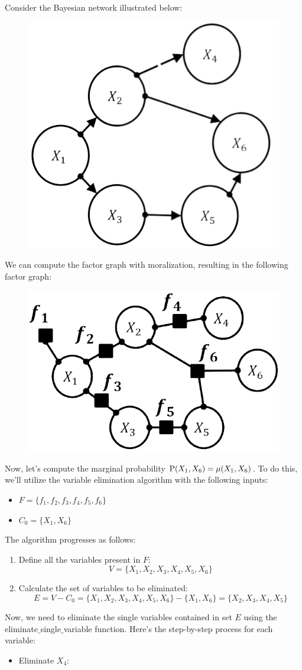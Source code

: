 \documentclass[12pt, a4paper]{report}
\begin{document}
    \begin{example}
        Consider the Bayesian network illustrated below:
        \begin{figure}[H]
            \centering
            \includegraphics[width=0.25\linewidth]{images/bn.png}
        \end{figure}
        We can compute the factor graph with moralization, resulting in the following factor graph:
        \begin{figure}[H]
            \centering
            \includegraphics[width=0.25\linewidth]{images/bnf1.png}
        \end{figure}
        Now, let's compute the marginal probability $\textnormal{P}(X_1,X_6)=\mu(X_1,X_6)$. To do this, we'll utilize the variable elimination algorithm with the following inputs:
        \begin{itemize}
            \item $F=\{f_1,f_2,f_3,f_4,f_5,f_6\}$
            \item $C_0=\{X_1,X_6\}$
        \end{itemize}
        The algorithm progresses as follows:
        \begin{enumerate}
            \item Define all the variables present in $F$: 
                \[V=\{X_1,X_2,X_3,X_4,X_5,X_6\}\]
            \item Calculate the set of variables to be eliminated:
                \[E=V-C_0=\{X_1,X_2,X_3,X_4,X_5,X_6\}-\{X_1,X_6\}=\{X_2,X_3,X_4,X_5\}\]
        \end{enumerate}
        Now, we need to eliminate the single variables contained in set $E$ using the  eliminate$\_$single$\_$variable function. Here's the step-by-step process for each variable:
        \begin{itemize}
            \item Eliminate $X_4$: 
                \begin{itemize}

\end{itemize}
\end{itemize}
\end{example}
\end{document}
